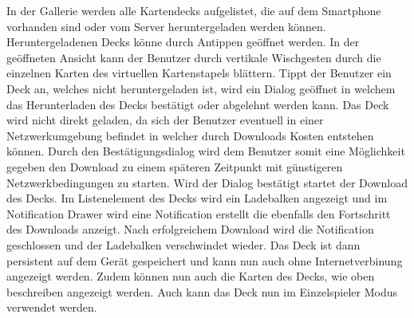 \documentclass{scrartcl}
\begin{document}
\noindent
In der Gallerie werden alle Kartendecks aufgelistet, die auf dem Smartphone
vorhanden sind oder vom Server heruntergeladen werden können. Heruntergeladenen
Decks könne durch Antippen geöffnet werden. In der geöffneten Ansicht kann der
Benutzer durch vertikale Wischgesten durch die einzelnen Karten des virtuellen
Kartenstapels blättern. Tippt der Benutzer ein Deck an, welches nicht
heruntergeladen ist, wird ein Dialog geöffnet in welchem das Herunterladen des
Decks bestätigt oder abgelehnt werden kann. Das Deck wird nicht direkt geladen,
da sich der Benutzer eventuell in einer Netzwerkumgebung befindet in welcher
durch Downloads Kosten entstehen können. Durch den Bestätigungsdialog wird dem
Benutzer somit eine Möglichkeit gegeben den Download zu einem späteren Zeitpunkt
mit günstigeren Netzwerkbedingungen zu starten. Wird der Dialog bestätigt startet
der Download des Decks. Im Listenelement des Decks wird ein Ladebalken angezeigt
und im Notification Drawer wird eine Notification erstellt die ebenfalls den
Fortschritt des Downloads anzeigt. Nach erfolgreichem Download wird die
Notification geschlossen und der Ladebalken verschwindet wieder. Das Deck ist
dann persistent auf dem Gerät gespeichert und kann nun auch ohne
Internetverbinung angezeigt werden. Zudem können nun auch die Karten des Decks,
wie oben beschreiben angezeigt werden. Auch kann das Deck nun im Einzelspieler
Modus verwendet werden.
\end{document}
